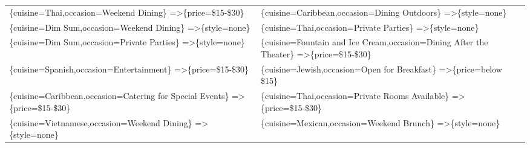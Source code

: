 \documentclass[letterpaper,10pt]{article}
\begin{document}
\begin{appendices}
\begin{table}[h]
\begin{adjustbox}{max width=\textwidth}
\begin{tabular}{ll}
\{cuisine=Thai,occasion=Weekend Dining\} =\textgreater \{price=\$15-\$30\} & \{cuisine=Caribbean,occasion=Dining Outdoors\} =\textgreater \{style=none\} \\ 
\{cuisine=Dim Sum,occasion=Weekend Dining\} =\textgreater \{style=none\} & \{cuisine=Thai,occasion=Private Parties\} =\textgreater \{style=none\} \\ 
\{cuisine=Dim Sum,occasion=Private Parties\} =\textgreater \{style=none\} & \{cuisine=Fountain and Ice Cream,occasion=Dining After the Theater\} =\textgreater \{price=\$15-\$30\} \\ 
\{cuisine=Spanish,occasion=Entertainment\} =\textgreater \{price=\$15-\$30\} & \{cuisine=Jewish,occasion=Open for Breakfast\} =\textgreater \{price=below \$15\} \\ 
\{cuisine=Caribbean,occasion=Catering for Special Events\} =\textgreater \{price=\$15-\$30\} & \{cuisine=Thai,occasion=Private Rooms Available\} =\textgreater \{price=\$15-\$30\} \\ 
\{cuisine=Vietnamese,occasion=Weekend Dining\} =\textgreater \{style=none\} & \{cuisine=Mexican,occasion=Weekend Brunch\} =\textgreater \{style=none\} \\ 


\end{tabular}
\end{adjustbox}
\end{table}
\end{appendices}
\end{document}
